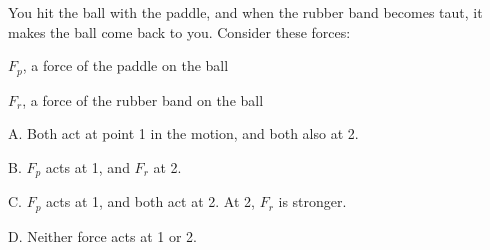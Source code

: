 \begin{qu}
\num{} You hit the ball with the paddle,
and when the rubber band becomes taut, it makes the ball come back to you.
Consider these forces:

$F_p$, a force of the paddle on the ball

$F_r$, a force of the rubber band on the ball

\noindent A. Both act at point 1 in the motion, and both also at 2.

\noindent B. $F_p$ acts at 1, and $F_r$ at 2.

\noindent C. $F_p$ acts at 1, and both act at 2. At 2, $F_r$ is stronger.

\noindent D. Neither force acts at 1 or 2.

\end{qu}
